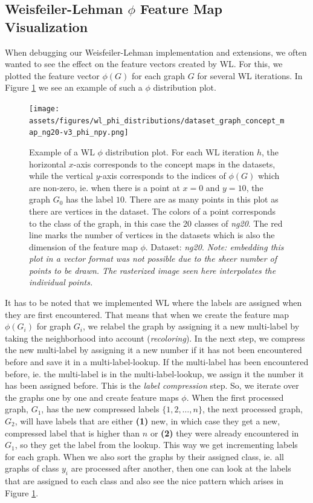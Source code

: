 
\subsection{Weisfeiler-Lehman $\phi$ Feature Map Visualization}
When debugging our Weisfeiler-Lehman implementation and extensions, we often wanted to see the effect on the feature vectors created by WL.
For this, we plotted the feature vector $\phi(G)$ for each graph $G$ for several WL iterations.
In Figure \ref{fig:phi_distribution_example} we see an example of such a $\phi$ distribution plot.

\begin{figure}[htb!]
	\centering
	{\texttt{[image: assets/figures/wl\_phi\_distributions/dataset\_graph\_concept\_map\_ng20-v3\_phi\_npy.png]}
		\caption[Example: $\phi$ distribution plot]{%
			Example of a WL $\phi$ distribution plot.
			For each WL iteration $h$, the horizontal $x$-axis corresponds to the concept maps in the datasets, while the vertical $y$-axis corresponds to the indices of $\phi(G)$ which are non-zero, ie. when there is a point at $x=0$ and $y=10$, the graph $G_0$ has the label $10$.
			There are as many points in this plot as there are vertices in the dataset.
			The colors of a point corresponds to the class of the graph, in this case the 20 classes of \textit{ng20}.
			The red line marks the number of vertices in the datasets which is also the dimension of the feature map $\phi$.
			Dataset: \textit{ng20}.
			\textit{Note: embedding this plot in a vector format  was not possible due to the sheer number of points to be drawn. The rasterized image seen here interpolates the individual points.}
		}%
		\label{fig:phi_distribution_example}}
\end{figure}

It has to be noted that we implemented WL where the labels are assigned when they are first encountered. That means that when we create the feature map $\phi(G_i)$ for graph $G_i$, we relabel the graph by assigning it a new multi-label by taking the neighborhood into account (\textit{recoloring}). In the next step, we compress the new multi-label by assigning it a new number if it has not been encountered before and save it in a multi-label-lookup. If the multi-label has been encountered before, ie. the multi-label is in the multi-label-lookup, we assign it the number it has been assigned before.
This is the \textit{label compression} step.
So, we iterate over the graphs one by one and create feature maps $\phi$.
When the first processed graph, $G_1$, has the new compressed labels $\{1, 2, \ldots, n\}$, the next processed graph, $G_2$, will have labels that are either \textbf{(1)} new, in which case they get a new, compressed label that is higher than $n$ or \textbf{(2)} they were already encountered in $G_1$, so they get the label from the lookup.
This way we get incrementing labels for each graph.
When we also sort the graphs by their assigned class, ie. all graphs of class $y_i$ are processed after another, then one can look at the labels that are assigned to each class and also see the nice pattern which arises in Figure \ref{fig:phi_distribution_example}.

